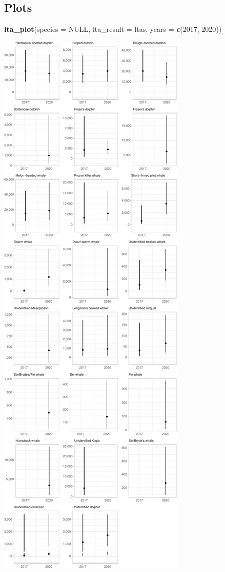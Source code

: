 \documentclass[
]{book}
\newenvironment{Shaded}{\begin{snugshade}}{\end{snugshade}}
\newcommand{\DataTypeTok}[1]{\textcolor[rgb]{0.13,0.29,0.53}{#1}}
\newcommand{\DecValTok}[1]{\textcolor[rgb]{0.00,0.00,0.81}{#1}}
\newcommand{\KeywordTok}[1]{\textcolor[rgb]{0.13,0.29,0.53}{\textbf{#1}}}
\newcommand{\NormalTok}[1]{#1}
\newcommand{\OtherTok}[1]{\textcolor[rgb]{0.56,0.35,0.01}{#1}}
\begin{document}
\hypertarget{plots-1}{%
\subsection*{Plots}\label{plots-1}}

\begin{Shaded}
\begin{Highlighting}[]
\KeywordTok{lta_plot}\NormalTok{(}\DataTypeTok{species =} \OtherTok{NULL}\NormalTok{, }
         \DataTypeTok{lta_result =}\NormalTok{ ltas, }
         \DataTypeTok{years =} \KeywordTok{c}\NormalTok{(}\DecValTok{2017}\NormalTok{, }\DecValTok{2020}\NormalTok{))}
\end{Highlighting}
\end{Shaded}

\includegraphics{figures/unnamed-chunk-376-1.pdf}
\end{document}
